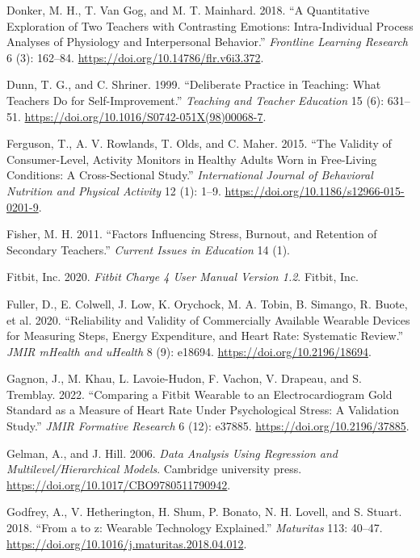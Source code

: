 \documentclass[preprint,
3p]{elsarticle} %
\newlength{\cslhangindent}
\newenvironment{CSLReferences}[2] %
 {\begin{list}{}{%
  \setlength{\itemindent}{0pt}
  \setlength{\leftmargin}{0pt}
  \setlength{\parsep}{0pt}
  \ifodd #1
   \setlength{\leftmargin}{\cslhangindent}
   \setlength{\itemindent}{-1\cslhangindent}
  \fi
  \setlength{\itemsep}{#2\baselineskip}}}
 {\end{list}}
\begin{document}
\begin{CSLReferences}{1}{0}
Donker, M. H., T. Van Gog, and M. T. Mainhard. 2018. {``A Quantitative
Exploration of Two Teachers with Contrasting Emotions: Intra-Individual
Process Analyses of Physiology and Interpersonal Behavior.''}
\emph{Frontline Learning Research} 6 (3): 162--84.
\url{https://doi.org/10.14786/flr.v6i3.372}.

Dunn, T. G., and C. Shriner. 1999. {``Deliberate Practice in Teaching:
What Teachers Do for Self-Improvement.''} \emph{Teaching and Teacher
Education} 15 (6): 631--51.
\url{https://doi.org/10.1016/S0742-051X(98)00068-7}.

Ferguson, T., A. V. Rowlands, T. Olds, and C. Maher. 2015. {``The
Validity of Consumer-Level, Activity Monitors in Healthy Adults Worn in
Free-Living Conditions: A Cross-Sectional Study.''} \emph{International
Journal of Behavioral Nutrition and Physical Activity} 12 (1): 1--9.
\url{https://doi.org/10.1186/s12966-015-0201-9}.

Fisher, M. H. 2011. {``Factors Influencing Stress, Burnout, and
Retention of Secondary Teachers.''} \emph{Current Issues in Education}
14 (1).

Fitbit, Inc. 2020. \emph{Fitbit Charge 4 User Manual Version 1.2}.
Fitbit, Inc.

Fuller, D., E. Colwell, J. Low, K. Orychock, M. A. Tobin, B. Simango, R.
Buote, et al. 2020. {``Reliability and Validity of Commercially
Available Wearable Devices for Measuring Steps, Energy Expenditure, and
Heart Rate: Systematic Review.''} \emph{JMIR mHealth and uHealth} 8 (9):
e18694. \url{https://doi.org/10.2196/18694}.

Gagnon, J., M. Khau, L. Lavoie-Hudon, F. Vachon, V. Drapeau, and S.
Tremblay. 2022. {``Comparing a Fitbit Wearable to an Electrocardiogram
Gold Standard as a Measure of Heart Rate Under Psychological Stress: A
Validation Study.''} \emph{JMIR Formative Research} 6 (12): e37885.
\url{https://doi.org/10.2196/37885}.

Gelman, A., and J. Hill. 2006. \emph{Data Analysis Using Regression and
Multilevel/Hierarchical Models}. Cambridge university press.
\url{https://doi.org/10.1017/CBO9780511790942}.

Godfrey, A., V. Hetherington, H. Shum, P. Bonato, N. H. Lovell, and S.
Stuart. 2018. {``From a to z: Wearable Technology Explained.''}
\emph{Maturitas} 113: 40--47.
\url{https://doi.org/10.1016/j.maturitas.2018.04.012}.


\end{CSLReferences}
\end{document}

